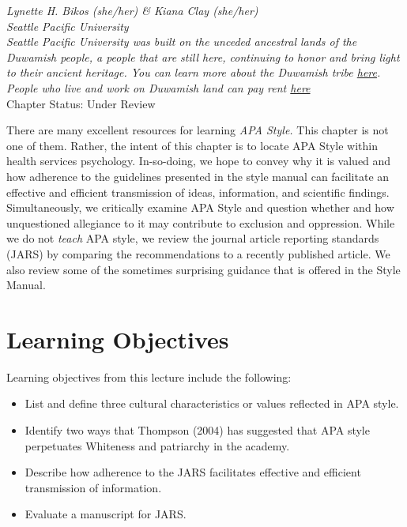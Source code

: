 \documentclass[
  11pt,
]{book}
\providecommand{\tightlist}{%
  \setlength{\itemsep}{0pt}\setlength{\parskip}{0pt}}
\begin{document}
\emph{Lynette H. Bikos (she/her) \& Kiana Clay (she/her)}\\
\emph{Seattle Pacific University}\\
\emph{Seattle Pacific University was built on the unceded ancestral lands of the Duwamish people, a people that are still here, continuing to honor and bring light to their ancient heritage. You can learn more about the Duwamish tribe \href{https://www.duwamishtribe.org/}{here}. People who live and work on Duwamish land can pay rent \href{https://www.realrentduwamish.org/}{here}}\\
Chapter Status: Under Review

There are many excellent resources for learning \emph{APA Style.} This chapter is not one of them. Rather, the intent of this chapter is to locate APA Style within health services psychology. In-so-doing, we hope to convey why it is valued and how adherence to the guidelines presented in the style manual can facilitate an effective and efficient transmission of ideas, information, and scientific findings. Simultaneously, we critically examine APA Style and question whether and how unquestioned allegiance to it may contribute to exclusion and oppression. While we do not \emph{teach} APA style, we review the journal article reporting standards (JARS) by comparing the recommendations to a recently published article. We also review some of the sometimes surprising guidance that is offered in the Style Manual.

\hypertarget{learning-objectives-3}{%
\section{Learning Objectives}\label{learning-objectives-3}}

Learning objectives from this lecture include the following:

\begin{itemize}
\tightlist
\item
  List and define three cultural characteristics or values reflected in APA style.
\item
  Identify two ways that Thompson (2004) has suggested that APA style perpetuates Whiteness and patriarchy in the academy.
\item
  Describe how adherence to the JARS facilitates effective and efficient transmission of information.
\item
  Evaluate a manuscript for JARS.
\end{itemize}
\end{document}
